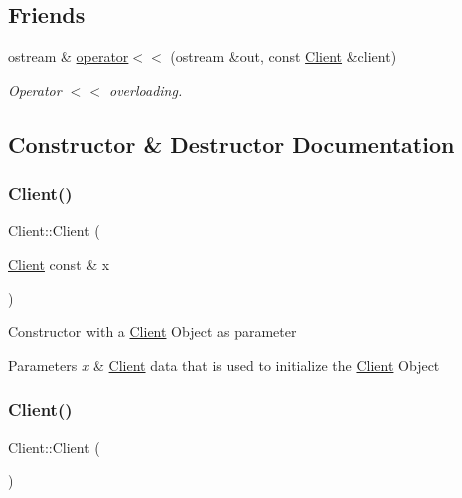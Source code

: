 \subsection*{Friends}
\begin{DoxyCompactItemize}
\item 
ostream \& \hyperlink{class_client_a001b1071dc56da194d697f845bbc4b1b}{operator$<$$<$} (ostream \&out, const \hyperlink{class_client}{Client} \&client)
\begin{DoxyCompactList}\small\item\em Operator $<$$<$ overloading. \end{DoxyCompactList}\end{DoxyCompactItemize}


\subsection{Constructor \& Destructor Documentation}
\mbox{\label{class_client_ab3079953a67493b5da6ffb32d4f14ac7}} 
\subsubsection{\texorpdfstring{Client()}{Client()}\hspace{0.1cm}{\footnotesize\ttfamily [1/3]}}
{\footnotesize\ttfamily Client\+::\+Client (\begin{DoxyParamCaption}\item[{\hyperlink{class_client}{Client} const \&}]{x }\end{DoxyParamCaption})}

Constructor with a \hyperlink{class_client}{Client} Object as parameter 
\begin{DoxyParams}{Parameters}
{\em x} & \hyperlink{class_client}{Client} data that is used to initialize the \hyperlink{class_client}{Client} Object \\
\hline
\end{DoxyParams}
\mbox{\label{class_client_ae51af7aa6b8f591496a8f6a4a87a14bf}} 
\subsubsection{\texorpdfstring{Client()}{Client()}\hspace{0.1cm}{\footnotesize\ttfamily [2/3]}}
{\footnotesize\ttfamily Client\+::\+Client (\begin{DoxyParamCaption}{ }\end{DoxyParamCaption})}

